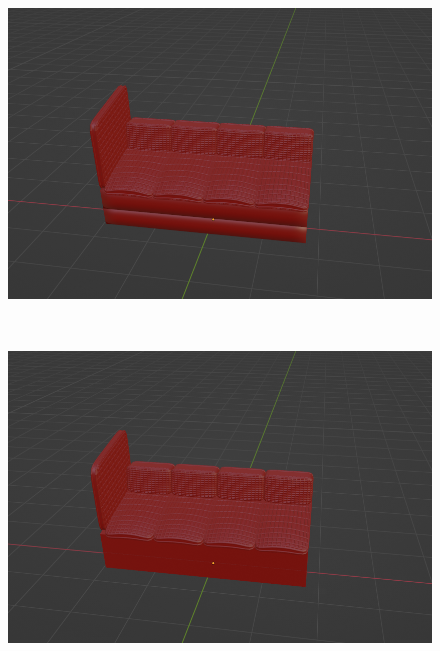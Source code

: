 \begin{figure}[h]
\begin{minipage}[b]{0.48\linewidth}
 \end{minipage}
 \begin{minipage}[b]{0.48\linewidth}
  \centering
  \includegraphics[scale=0.17]{./imgs/sofaParamMean/creaseMax.png}
 \end{minipage}\\
 \begin{minipage}[b]{0.48\linewidth}
  \centering
  \includegraphics[scale=0.17]{./imgs/sofaParamMean/bevelMin.png}
 \end{minipage}
 \begin{minipage}[b]{0.48\linewidth}
  \centering

\end{minipage}
\end{figure}
